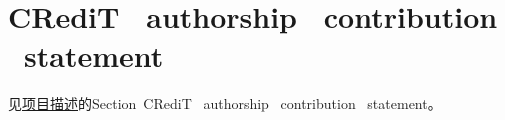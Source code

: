 \documentclass[a4paper,fleqn]{cas-sc}
\begin{document}
%
%
%
%

\FloatBarrier

\section*{CRediT ~authorship ~contribution ~statement}
见\href{https://github.com/WZYivan/FeHALS/blob/master/DESCRIPTION.pdf}{项目描述}的Section~\textcolor{hscolor}{CRediT ~authorship ~contribution ~statement}。

\newpage


\end{document}
